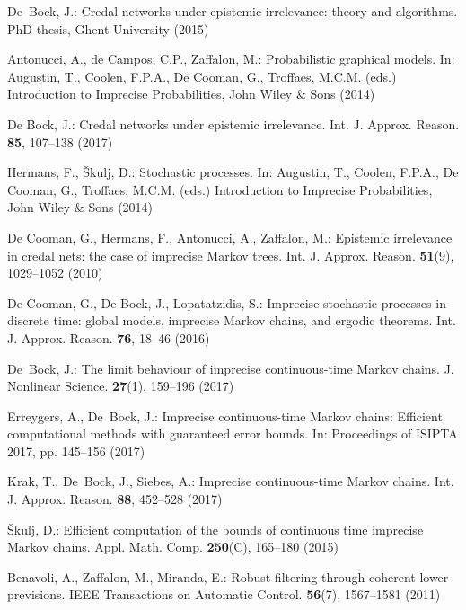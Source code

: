 \begin{thebibliography}{99.}
De~Bock, J.: {Credal networks under epistemic irrelevance: theory and
  algorithms}. PhD thesis, Ghent University (2015)

Antonucci, A., de Campos, C.P., Zaffalon, M.: {Probabilistic graphical models}. In: Augustin, T., Coolen, F.P.A., De Cooman, G., Troffaes, M.C.M. (eds.) Introduction to Imprecise Probabilities, {John Wiley \& Sons} (2014) 

De Bock, J.: {Credal networks under epistemic irrelevance}. Int. J. Approx. Reason. \textbf{85}, 107--138 (2017)


Hermans, F., {\v{S}}kulj, D.: {Stochastic processes}.
In: Augustin, T., Coolen, F.P.A., De Cooman, G., Troffaes, M.C.M. (eds.) Introduction to Imprecise Probabilities, {John Wiley \& Sons} (2014) 

De Cooman, G., Hermans, F., Antonucci, A., Zaffalon, M.: {Epistemic irrelevance in credal nets: the case of imprecise Markov trees}. Int. J. Approx. Reason. \textbf{51}(9), 1029--1052 (2010)

De Cooman, G., De Bock, J., Lopatatzidis, S.: {Imprecise stochastic processes in discrete time: global models, imprecise Markov chains, and ergodic theorems}. Int. J. Approx. Reason. \textbf{76}, 18--46 (2016)


De~Bock, J.: {The limit behaviour of imprecise continuous-time Markov chains}. J. Nonlinear Science. \textbf{27}(1), 159--196 (2017)

Erreygers, A., De~Bock, J.: {Imprecise continuous-time Markov chains: Efficient
  computational methods with guaranteed error bounds}. In: Proceedings of ISIPTA
  2017, pp. 145--156 (2017)

Krak, T., De~Bock, J., Siebes, A.: {Imprecise continuous-time {M}arkov chains}.
  Int. J. Approx. Reason. \textbf{88}, 452--528 (2017)

{\v{S}}kulj, D.: {Efficient computation of the bounds of continuous time
  imprecise Markov chains}. Appl. Math. Comp. \textbf{250}(C), 165--180 (2015)


Benavoli, A., Zaffalon, M., Miranda, E.: {Robust filtering through coherent lower previsions}. IEEE Transactions on Automatic Control. \textbf{56}(7), 1567--1581 (2011)


\end{thebibliography}
